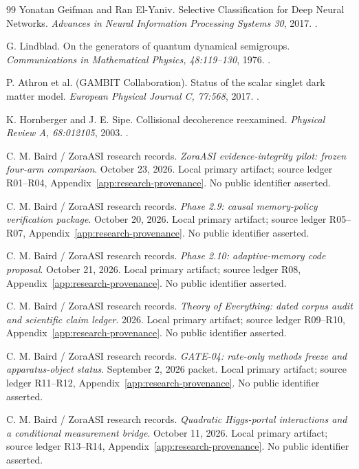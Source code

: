 \begin{thebibliography}{99}
 Yonatan Geifman and Ran El-Yaniv. Selective Classification for Deep Neural Networks. \emph{Advances in Neural Information Processing Systems 30}, 2017. .

 G. Lindblad. On the generators of quantum dynamical semigroups. \emph{Communications in Mathematical Physics, 48:119--130}, 1976. .

 P. Athron et al. (GAMBIT Collaboration). Status of the scalar singlet dark matter model. \emph{European Physical Journal C, 77:568}, 2017. .

 K. Hornberger and J. E. Sipe. Collisional decoherence reexamined. \emph{Physical Review A, 68:012105}, 2003. .

 C. M. Baird / ZoraASI research records. \emph{ZoraASI evidence-integrity pilot: frozen four-arm comparison}. October 23, 2026. Local primary artifact; source ledger R01--R04, Appendix~\ref{app:research-provenance}. No public identifier asserted.

 C. M. Baird / ZoraASI research records. \emph{Phase 2.9: causal memory-policy verification package}. October 20, 2026. Local primary artifact; source ledger R05--R07, Appendix~\ref{app:research-provenance}. No public identifier asserted.

 C. M. Baird / ZoraASI research records. \emph{Phase 2.10: adaptive-memory code proposal}. October 21, 2026. Local primary artifact; source ledger R08, Appendix~\ref{app:research-provenance}. No public identifier asserted.

 C. M. Baird / ZoraASI research records. \emph{Theory of Everything: dated corpus audit and scientific claim ledger}. 2026. Local primary artifact; source ledger R09--R10, Appendix~\ref{app:research-provenance}. No public identifier asserted.

 C. M. Baird / ZoraASI research records. \emph{GATE-04: rate-only methods freeze and apparatus-object status}. September 2, 2026 packet. Local primary artifact; source ledger R11--R12, Appendix~\ref{app:research-provenance}. No public identifier asserted.

 C. M. Baird / ZoraASI research records. \emph{Quadratic Higgs-portal interactions and a conditional measurement bridge}. October 11, 2026. Local primary artifact; source ledger R13--R14, Appendix~\ref{app:research-provenance}. No public identifier asserted.


\end{thebibliography}
